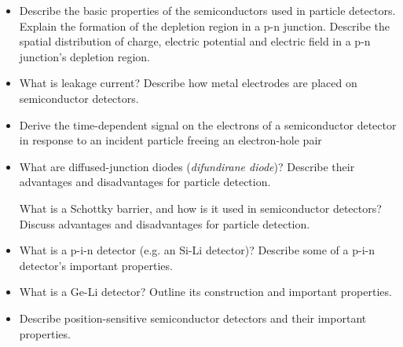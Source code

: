 \begin{itemize}

    \item Describe the basic properties of the semiconductors used in particle detectors. 
    Explain the formation of the depletion region in a p-n junction.
    Describe the spatial distribution of charge, electric potential and electric field in a p-n junction's depletion region.

    \item What is leakage current?
    Describe how metal electrodes are placed on semiconductor detectors.

    \item Derive the time-dependent signal on the electrons of a semiconductor detector in response to an incident particle freeing an electron-hole pair

    \item What are diffused-junction diodes (\textit{difundirane diode})?
    Describe their advantages and disadvantages for particle detection.

    What is a Schottky barrier, and how is it used in semiconductor detectors?
    Discuss advantages and disadvantages for particle detection.

    \item What is a p-i-n detector (e.g. an Si-Li detector)? 
    Describe some of a p-i-n detector's important properties.

    \item What is a Ge-Li detector?
    Outline its construction and important properties.

    \item Describe position-sensitive semiconductor detectors and their important properties.

\end{itemize}

